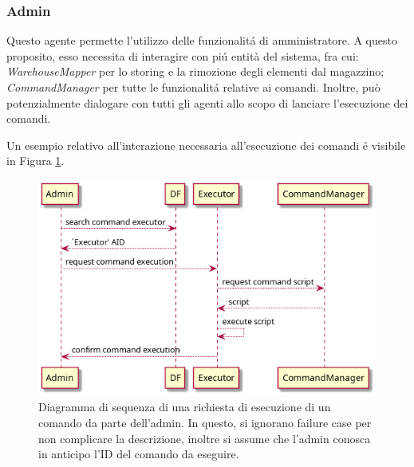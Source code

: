 \subsubsection{Admin}
Questo agente permette l'utilizzo delle funzionalit\'a di amministratore. A questo proposito, esso necessita di interagire con pi\'u entità del sistema, fra cui: \textit{WarehouseMapper} per lo storing e la rimozione degli elementi dal magazzino; \textit{CommandManager} per tutte le funzionalit\'a relative ai comandi. Inoltre, può potenzialmente dialogare con tutti gli agenti allo scopo di lanciare l'esecuzione dei comandi.

Un esempio relativo all'interazione necessaria all'esecuzione dei comandi \'e visibile in Figura \ref{fig:command_execution-sequence_diagram}.
\begin{figure}[!ht]\centering
    \includegraphics[width=\textwidth]{section/design/figure/command_execution-sequence_diagram.png}
    \caption{Diagramma di sequenza di una richiesta di esecuzione di un comando da parte dell'admin. In questo, si ignorano failure case per non complicare la descrizione, inoltre si assume che l'admin conosca in anticipo l'ID del comando da eseguire.}
    \label{fig:command_execution-sequence_diagram}
\end{figure}

